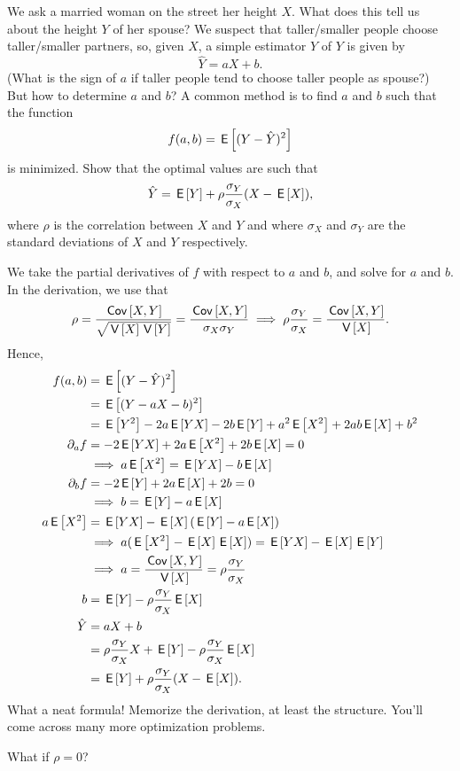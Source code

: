 \begin{exercise}
We ask a married woman on the street her height $X$.
What does this tell us about the height $Y$ of her spouse?
We suspect that taller/smaller people choose taller/smaller partners, so, given $X$, a simple estimator $\hat Y$ of $Y$ is given by
\begin{equation*}
  \hat Y = a X + b.
\end{equation*}
(What is the sign of $a$ if taller people tend to choose taller people as spouse?)
But how to determine $a$ and $b$? A common method is to find $a$ and $b$ such that the function
\begin{equation*}
  f(a,b) = \,\mathsf{E}\left[(Y-\hat Y)^2\right]
\end{equation*}
is minimized. Show that the optimal values are such that
\begin{align*}
  \hat Y = \,\mathsf{E}\left[Y\right] + \rho \frac{\sigma_Y}{\sigma_X} (X - \,\mathsf{E}\left[X\right]),
\end{align*}
where $\rho$ is the correlation between $X$ and $Y$ and where $\sigma_X$ and $\sigma_Y$ are the standard deviations of $X$ and $Y$ respectively.

\begin{solution}
We take the partial derivatives of $f$ with respect to $a$ and $b$, and solve for $a$ and $b$. In the derivation, we use that
\begin{align}
  \label{eq:6}
\rho = \frac{\,\mathsf{Cov}\left[X,Y\right]}{\sqrt{\,\mathsf{V}\left[X\right] \,\mathsf{V}\left[Y\right]}} = \frac{\,\mathsf{Cov}\left[X,Y\right]}{\sigma_X \sigma_Y} \implies  \rho \frac{\sigma_{Y}}{\sigma_{X}} = \frac{\,\mathsf{Cov}\left[X,Y\right]}{\,\mathsf{V}\left[X\right]}.
\end{align}
Hence,
  \begin{align*}
f(a,b) &= \,\mathsf{E}\left[(Y-\hat Y)^2\right] \\
 &= \,\mathsf{E}\left[(Y-a X - b)^2\right] \\
 &= \,\mathsf{E}\left[Y^{2}\right] - 2a\,\mathsf{E}\left[YX\right] - 2b\,\mathsf{E}\left[Y\right] + a^{2}\,\mathsf{E}\left[X^2\right] + 2 ab \,\mathsf{E}\left[X\right] + b^{2}\\
\partial_{a} f &=-2 \,\mathsf{E}\left[YX\right] + 2a \,\mathsf{E}\left[X^2\right] + 2 b \,\mathsf{E}\left[X\right] = 0 \\
&\implies a \,\mathsf{E}\left[X^2\right] =  \,\mathsf{E}\left[YX\right]  -  b \,\mathsf{E}\left[X\right] \\
\partial_{b} f &=-2 \,\mathsf{E}\left[Y\right]  + 2 a \,\mathsf{E}\left[X\right]  + 2 b= 0 \\
& \implies  b = \,\mathsf{E}\left[Y\right] - a \,\mathsf{E}\left[X\right]\\
a \,\mathsf{E}\left[X^2\right] &=  \,\mathsf{E}\left[YX\right]  -  \,\mathsf{E}\left[X\right] (\,\mathsf{E}\left[Y\right] - a \,\mathsf{E}\left[X\right]) \\
&\implies  a (\,\mathsf{E}\left[X^{2}\right] - \,\mathsf{E}\left[X\right] \,\mathsf{E}\left[X\right])  = \,\mathsf{E}\left[YX\right] - \,\mathsf{E}\left[X\right] \,\mathsf{E}\left[Y\right]  \\
&\implies a = \frac{\,\mathsf{Cov}\left[X,Y\right]}{\,\mathsf{V}\left[X\right]} = \rho \frac{\sigma_Y}{\sigma_X}\\
b &= \,\mathsf{E}\left[Y\right] - \rho \frac{\sigma_Y}{\sigma_X}\,\mathsf{E}\left[X\right]\\
\hat Y &= a X + b \\
&= \rho \frac{\sigma_Y}{\sigma_X} X + \,\mathsf{E}\left[Y\right] - \rho\frac{\sigma_Y}{\sigma_X} \,\mathsf{E}\left[X\right] \\
&=  \,\mathsf{E}\left[Y\right] + \rho \frac{\sigma_Y}{\sigma_X} (X-\,\mathsf{E}\left[X\right]).
  \end{align*}
What a neat formula! Memorize the derivation, at least the structure. You'll come across many more optimization problems.

What if $\rho=0$?
\end{solution}
\end{exercise}

